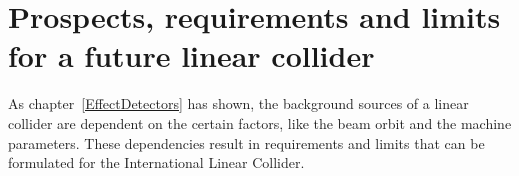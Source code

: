 \chapter{Prospects, requirements and limits for a future linear collider}
\label{Results}

As chapter~\ref{EffectDetectors} has shown, the background sources of a linear collider are dependent on the certain factors, like the beam orbit and the machine parameters.
These dependencies result in requirements and limits that can be formulated for the International Linear Collider.